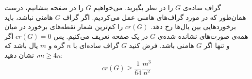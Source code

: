 \EXERCISE
گراف ساده‌ی
$G$
را در نظر بگیرید. می‌خواهیم
$G$
را در صفحه بنشانیم، درست همان‌طور که در مورد گراف‌های هامنی عمل می‌کردیم. اگر گراف
$G$
هامنی نباشد، باید برخوردهایی بین یال‌ها رخ دهد.
$cr(G)$
را کم‌ترین شمار نقطه‌های برخورد در میان همه‌ی صورت‌های نشانده شده‌ی
$G$
در یک صفحه تعریف می‌کنیم. پس
$cr(G) = 0$
اگر و تنها اگر
$G$
هامنی باشد. فرض کنید
$G$
گراف ساده‌ای با
$n$
گره و
$m$
یال باشد که$m \geq 4n$، نشان دهید:
$$cr(G) \geq \frac{1}{64} \frac{m^3}{n^2}$$